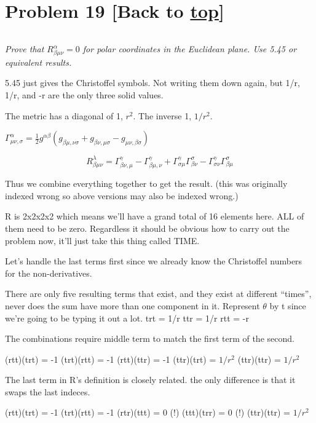 \documentclass[landscape,letterpaper,10pt,english]{article}
\begin{document}
    \hypertarget{problem-19-back-to-top}{%
\section{\texorpdfstring{Problem 19 {[}Back to
\hyperref[toc]{top}{]}}{Problem 19 {[}Back to {]}}}\label{problem-19-back-to-top}}

\[\label{P19}\]

\emph{Prove that \(R^\alpha_{\beta\mu\nu}=0\) for polar coordinates in
the Euclidean plane. Use 5.45 or equivalent results.}

5.45 just gives the Christoffel symbols. Not writing them down again,
but 1/r, 1/r, and -r are the only three solid values.

The metric has a diagonal of 1, \(r^2\). The inverse 1, \(1/r^2\).

\(\Gamma^\alpha_{\mu\nu,\sigma} = \frac12 g^{\alpha\beta} \left( g_{\beta\mu,\nu\sigma} + g_{\beta\nu,\mu\sigma} - g_{\mu\nu,\beta\sigma} \right)\)

\[ R^\lambda_{\beta\mu\nu} = \Gamma^\gamma_{\beta\nu,\mu} - \Gamma^\gamma_{\beta\mu,\nu} + \Gamma^\gamma_{\sigma\mu} \Gamma^\sigma_{\beta\nu} - \Gamma^\gamma_{\sigma\nu} \Gamma^\sigma_{\beta\mu}  \]

Thus we combine everything together to get the result. (this was
originally indexed wrong so above versions may also be indexed wrong.)

    R is 2x2x2x2 which means we'll have a grand total of 16 elements here.
ALL of them need to be zero. Regardless it should be obvious how to
carry out the problem now, it'll just take this thing called TIME.

Let's handle the last terms first since we already know the Christoffel
numbers for the non-derivatives.

There are only five resulting terms that exist, and they exist at
different ``times'', never does the sum have more than one component in
it. Represent \(\theta\) by t since we're going to be typing it out a
lot. trt = 1/r ttr = 1/r rtt = -r

The combinations require middle term to match the first term of the
second.

(rtt)(trt) = -1 (trt)(rtt) = -1 (rtt)(ttr) = -1 (ttr)(trt) = \(1/r^2\)
(ttr)(ttr) = \(1/r^2\)

The last term in R's definition is closely related. the only difference
is that it swaps the last indeces.

(rtt)(trt) = -1 (trt)(rtt) = -1 (rtr)(ttt) = 0 (!) (ttt)(trr) = 0 (!)
(ttr)(ttr) = \(1/r^2\)
\end{document}
